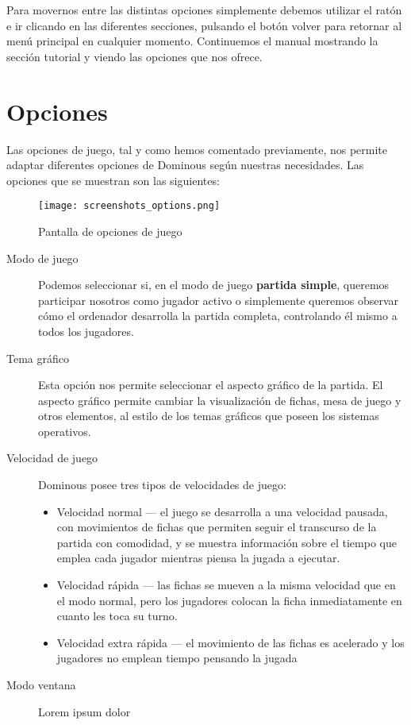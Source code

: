 Para movernos entre las distintas opciones simplemente debemos utilizar el ratón e ir clicando en las diferentes secciones,
pulsando el botón volver para retornar al menú principal en cualquier momento. Continuemos el manual mostrando la sección
tutorial y viendo las opciones que nos ofrece.

\section{Opciones}

Las opciones de juego, tal y como hemos comentado previamente, nos permite adaptar diferentes opciones de Dominous según
nuestras necesidades. Las opciones que se muestran son las siguientes:

\begin{figure}[h]
  \label{screenshots_options}
  \begin{center}
    \texttt{[image: screenshots\_options.png]}
  \end{center}
  \caption{Pantalla de opciones de juego}
\end{figure}

\begin{description}
    \item[Modo de juego] Podemos seleccionar si, en el modo de juego \textbf{partida simple}, queremos participar nosotros
        como jugador activo o simplemente queremos observar cómo el ordenador desarrolla la partida completa, controlando
        él mismo a todos los jugadores. 
    \item[Tema gráfico] Esta opción nos permite seleccionar el aspecto gráfico de la partida. El aspecto gráfico permite
        cambiar la visualización de fichas, mesa de juego y otros elementos, al estilo de los temas gráficos que poseen
        los sistemas operativos.
    \item[Velocidad de juego] Dominous posee tres tipos de velocidades de juego:
        \begin{itemize}
            \item Velocidad normal --- el juego se desarrolla a una velocidad pausada, con movimientos de fichas que permiten
                seguir el transcurso de la partida con comodidad, y se muestra información sobre el tiempo que emplea cada
                jugador mientras piensa la jugada a ejecutar.
            \item Velocidad rápida --- las fichas se mueven a la misma velocidad que en el modo normal, pero los jugadores
                colocan la ficha inmediatamente en cuanto les toca su turno.
            \item Velocidad extra rápida --- el movimiento de las fichas es acelerado y los jugadores no emplean tiempo
                pensando la jugada
        \end{itemize}
    \item[Modo ventana] Lorem ipsum dolor
\end{description}

